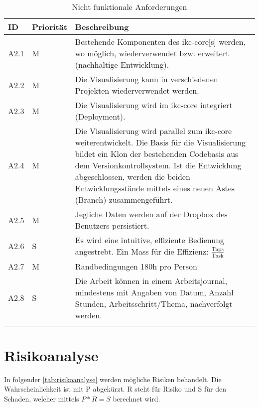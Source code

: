 \begin{longtable}{|p{1.5cm} | p{1.5cm} | p{8.1cm}|}
  \hline
    ID & Priorität & Beschreibung \\\hline
    A2.1 & M & Bestehende Komponenten des \gls{ikc-core}[s] werden, wo möglich, wiederverwendet bzw. erweitert (nachhaltige Entwicklung).\\\hline
    A2.2 & M & Die Visualisierung kann in verschiedenen Projekten wiederverwendet werden.\\\hline
    A2.3 & M & Die Visualisierung wird im \gls{ikc-core} integriert (Deployment).\\\hline
    A2.4 & M & Die Visualisierung wird parallel zum \gls{ikc-core} weiterentwickelt. Die Basis für die Visualisierung bildet ein Klon der bestehenden Codebasis aus dem Versionkontrollsystem. Ist die Entwicklung abgeschlossen, werden die beiden Entwicklungsstände mittels eines neuen Astes (Branch) zusammengeführt.\\\hline
    A2.5 & M & Jegliche Daten werden auf der Dropbox des Benutzers persistiert.\\\hline
    A2.6 & S & Es wird eine intuitive, effiziente Bedienung angestrebt. Ein Mass für die Effizienz: $\frac{\text{Taps}}{\text{Task}}$\\\hline
    A2.7 & M & Randbedingungen 180h pro Person\\\hline
    A2.8 & S & Die Arbeit können in einem Arbeitsjournal, mindestens mit Angaben von Datum, Anzahl Stunden, Arbeitsschritt/Thema, nachverfolgt werden.\\\hline
    \caption{Nicht funktionale Anforderungen}
  \label{tab:nicht-funktionale-anforderungen}
\end{longtable}

\section{Risikoanalyse}\label{risikoanalyse}

In folgender \autoref{tab:risikoanalyse} werden mögliche Risiken behandelt. Die Wahrscheinlichkeit ist mit P abgekürzt. R steht für Risiko und S für den Schaden, welcher mittels $P*R=S$ berechnet wird.

\clearpage

